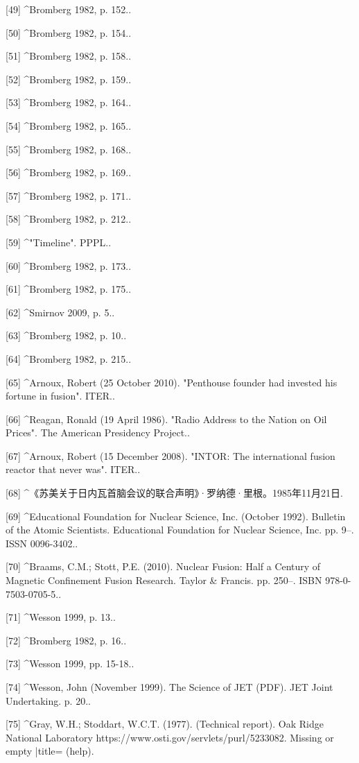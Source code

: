 [49]
^Bromberg 1982, p. 152..

[50]
^Bromberg 1982, p. 154..

[51]
^Bromberg 1982, p. 158..

[52]
^Bromberg 1982, p. 159..

[53]
^Bromberg 1982, p. 164..

[54]
^Bromberg 1982, p. 165..

[55]
^Bromberg 1982, p. 168..

[56]
^Bromberg 1982, p. 169..

[57]
^Bromberg 1982, p. 171..

[58]
^Bromberg 1982, p. 212..

[59]
^"Timeline". PPPL..

[60]
^Bromberg 1982, p. 173..

[61]
^Bromberg 1982, p. 175..

[62]
^Smirnov 2009, p. 5..

[63]
^Bromberg 1982, p. 10..

[64]
^Bromberg 1982, p. 215..

[65]
^Arnoux, Robert (25 October 2010). "Penthouse founder had invested his fortune in fusion". ITER..

[66]
^Reagan, Ronald (19 April 1986). "Radio Address to the Nation on Oil Prices". The American Presidency Project..

[67]
^Arnoux, Robert (15 December 2008). "INTOR: The international fusion reactor that never was". ITER..

[68]
^《苏美关于日内瓦首脑会议的联合声明》·罗纳德·里根。1985年11月21日.

[69]
^Educational Foundation for Nuclear Science, Inc. (October 1992). Bulletin of the Atomic Scientists. Educational Foundation for Nuclear Science, Inc. pp. 9–. ISSN 0096-3402..

[70]
^Braams, C.M.; Stott, P.E. (2010). Nuclear Fusion: Half a Century of Magnetic Confinement Fusion Research. Taylor & Francis. pp. 250–. ISBN 978-0-7503-0705-5..

[71]
^Wesson 1999, p. 13..

[72]
^Bromberg 1982, p. 16..

[73]
^Wesson 1999, pp. 15-18..

[74]
^Wesson, John (November 1999). The Science of JET (PDF). JET Joint Undertaking. p. 20..

[75]
^Gray, W.H.; Stoddart, W.C.T. (1977). (Technical report). Oak Ridge National Laboratory https://www.osti.gov/servlets/purl/5233082. Missing or empty |title= (help).

